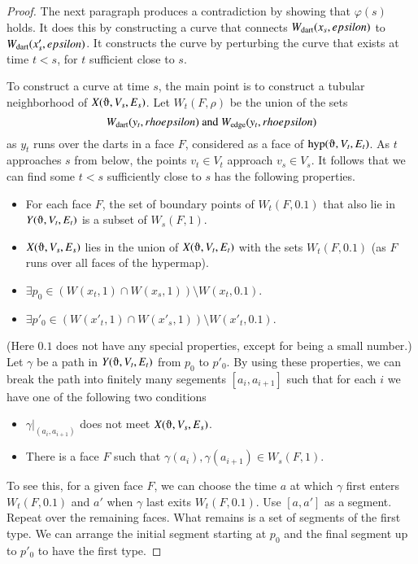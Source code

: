 \begin{proof}
The next paragraph produces a contradiction
by showing that $\varphi(s)$ holds.  It does this by
constructing a curve that connects $W_{\text{dart}}(x_s,epsilon)$ to $W_{\text{dart}}(x'_s,epsilon)$.
It constructs the curve by perturbing the curve that
exists at time $t<s$, for $t$ sufficient close to $s$.  

To construct
a curve at time $s$,  the main point is to construct
a tubular neighborhood of $X(\orgn,V_s,E_s)$.
Let $W_t(F,\rho)$ be the union of the sets
   $$W_{\text{dart}}(y_t,rhoepsilon) \text{ and } W_{\text{edge}}(y_t,rhoepsilon)$$
as $y_t$ runs over the darts in a face $F$, considered as a face
of $\op{hyp}(\orgn,V_t,E_t)$.
As $t$ approaches $s$ from below, the points $v_t\in V_t$
approach $v_s\in V_s$.  It follows that we can find
some $t<s$ sufficiently close to $s$ has the
following properties.
\begin{itemize}
 \item For each face $F$, the set of boundary points of $W_t(F,0.1)$ that
   also lie in $Y(\orgn,V_t,E_t)$ is a subset of $W_s(F,1)$.
 \item  $X(\orgn,V_s,E_s)$ lies in the union of $X(\orgn,V_t,E_t)$ with
  the
  sets $W_t(F,0.1)$ (as $F$ runs over all faces of the hypermap).
 \item $\exists p_0 \in (W(x_t,1)\cap W(x_s,1)) \setminus W(x_t,0.1)$.
 \item $\exists p'_0 \in (W(x'_t,1)\cap W(x'_s,1)) \setminus W(x'_t,0.1)$.
\end{itemize}
(Here $0.1$ does not have any special properties, except for being a small number.)
Let $\gamma$ be a path in $Y(\orgn,V_t,E_t)$ from $p_0$ to $p'_0$.
By using these  properties, 
we can break the path into finitely many
segements $[a_i,a_{i+1}]$ such that for each $i$ we have one
of the following two conditions
\begin{itemize} 
\item
$\gamma|_{(a_i,a_{i+1})}$ does not meet $X(\orgn,V_s,E_s)$.
\item There is a face $F$ such that
$\gamma(a_i), \gamma(a_{i+1})\in W_s(F,1)$.
\end{itemize}

To see this, for a given face $F$, we can choose the time $a$ at
which $\gamma$ first enters $W_t(F,0.1)$ and $a'$ when $\gamma$ last
exits $W_t(F,0.1)$.  Use $[a,a']$ as a segment.  Repeat over the
remaining faces.  What remains is a set of segments of the first type.
We can arrange the initial segment starting at $p_0$ and the final
segment up to $p'_0$ to have the first type.


\end{proof}
